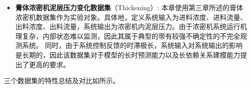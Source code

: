 \begin{itemize}
    \item \textbf{膏体浓密机泥层压力变化数据集}（Thickening）:
    本章使用第三章所述的膏体浓密机数据集作为实验对象。具体地，定义系统输入为进料浓度、进料流量、出料浓度、出料流量，系统输出为浓密机内泥层压力。由于浓密机系统运行机理复杂，内部状态难以监测，因此其属于典型的带有较强不确定性的不完全观测系统。
    同时，由于系统控制反馈的时滞极长，系统输入对系统输出的影响是长期的，因此该数据集对于模型的长时预测能力以及长依赖关系建模能力提出了更高的要求。
    
\end{itemize}
三个数据集的特性总结及对比如所示。
\begin{table}
\centering
\caption{数据集特性}
\label{tab:5_dataset}
\end{table}
